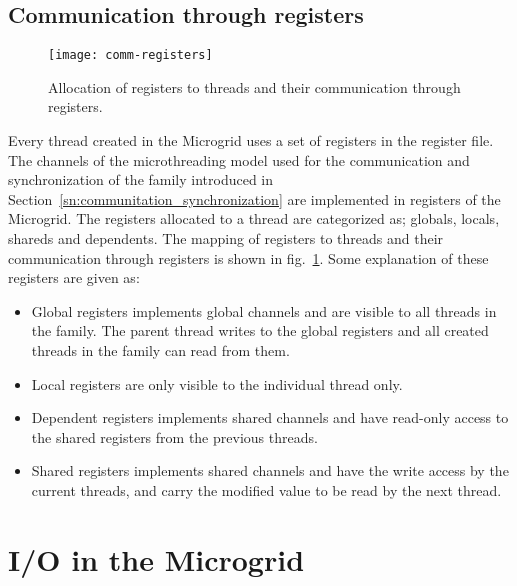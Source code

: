 \documentclass{article}
\begin{document}
\subsection{Communication through registers}\label{sn:registers}

\begin{figure}
\begin{centering}
    \texttt{[image: comm-registers]}
    \caption{\label{fig:comm_registers}Allocation of registers to threads and their communication through
    registers.}
\end{centering}
\end{figure}

Every thread created in the Microgrid uses a set of registers in the register
file. The channels of the microthreading model used for the communication and
synchronization of the family introduced
in Section~\ref{sn:communitation_synchronization} are implemented in registers of the
Microgrid. The registers allocated to a thread are categorized as; globals,
locals, shareds and dependents. The mapping of registers to threads and their
communication through registers is shown in fig.~\ref{fig:comm_registers}. Some
explanation of these registers are given as:

\begin{itemize}

\item Global registers implements global channels and are visible to all
    threads in the family. The parent thread writes to the global registers and
    all created threads in the family can read from them.

\item Local registers are only visible to the individual thread only.

\item Dependent registers implements shared channels and have read-only access
    to the shared registers from the previous threads.

\item Shared registers implements shared channels and have the write access by
    the current threads, and carry the modified value to be read by the next
    thread.

\end{itemize}

\section{I/O in the Microgrid}
\label{sn:io_microgrid}
\end{document}
